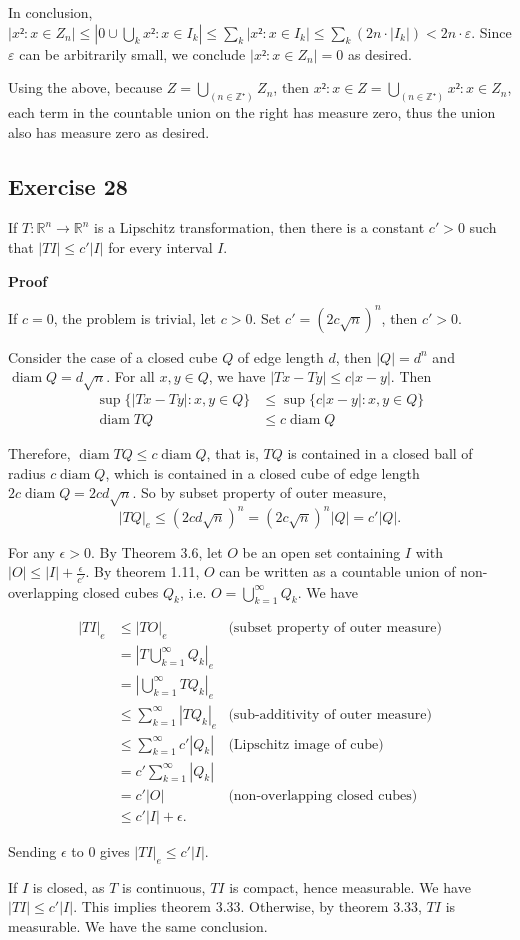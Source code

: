 \documentclass{article}
\DeclareMathOperator{\diam}{diam}
\newcommand\R{\mathbb{R}}
\begin{document}
In conclusion, $|{x²: x ∈ Z_n}| ≤ |{0} ∪ ⋃_k {x²: x ∈ I_k}| ≤ ∑_k |{x²: x ∈ I_k}| ≤ ∑_k (2n ⋅ |I_k|) < 2n ⋅ ε$. Since $ε$ can be arbitrarily small, we conclude $|{x²: x ∈ Z_n}|=0$ as desired.

Using the above, because $Z = ⋃_(n ∈ ℤ⁺) Z_n$, then ${x²: x ∈ Z}= ⋃_(n ∈ ℤ⁺) {x²: x ∈ Z_n}$, each term in the countable union on the right has measure zero, thus the union also has measure zero as desired.
\typstmathinputdisable{\$}

\subsection{Exercise 28} %

If $T: \R^n \to \R^n$ is a Lipschitz transformation, then there is a constant $c' > 0$ such that $|TI| \leq c'|I|$ for every interval $I$.

\textbf{Proof}

If $c = 0$, the problem is trivial, let $c >0$. Set $c'=(2 c \sqrt{n})^n$, then $c'>0$.

Consider the case of a closed cube $Q$ of edge length $d$, then $|Q| = d^n$ and $\diam Q = d \sqrt{n}$. For all $x, y \in Q$, we have $|Tx - Ty| \leq c|x - y|$. Then
\begin{align*}
    \sup \{|Tx - Ty|: x, y \in Q\}  &\leq \sup \{ c|x - y|: x, y \in Q\} \\
    \diam TQ &\leq c \diam Q
\end{align*}

Therefore, $\diam TQ \leq c \diam Q$, that is, $TQ$ is contained in a closed ball of radius $c \diam Q$, which is contained in a closed cube of edge length $2 c \diam Q = 2cd\sqrt{n}$. So by subset property of outer measure, \[|TQ|_e \leq (2 c d\sqrt{n})^n = (2 c \sqrt{n})^n |Q| = c' |Q|.\]

For any $\epsilon > 0$. By Theorem 3.6, let $O$ be an open set containing $I$ with $|O| \leq |I| + \frac{\epsilon}{c'}$.
By theorem 1.11, $O$ can be written as a countable union of non-overlapping closed cubes $Q_k$, i.e. $O = \bigcup_{k=1}^\infty Q_k$. We have


\begin{align*}
    |TI|_e
        &\leq | TO |_e &\text{(subset property of outer measure)} \\
        &= \left| T\bigcup_{k=1}^\infty Q_k \right|_e\\
        &= \left| \bigcup_{k=1}^\infty T Q_k \right|_e \\
        &\leq \sum_{k=1}^\infty |T Q_k|_e &\text{(sub-additivity of outer measure)} \\
        &\leq \sum_{k=1}^\infty c'|Q_k| &\text{(Lipschitz image of cube)} \\
        &= c' \sum_{k=1}^\infty |Q_k|\\
        &= c' |O| &\text{(non-overlapping closed cubes)} \\
        &\leq c' |I| + \epsilon.
\end{align*}

Sending $\epsilon$ to $0$ gives $|TI|_e \leq c' |I|$.

If $I$ is closed, as $T$ is continuous, $TI$ is compact, hence measurable. We have $|TI| \leq c' |I|$. This implies theorem 3.33.
Otherwise, by theorem 3.33, $TI$ is measurable. We have the same conclusion.
\end{document}

